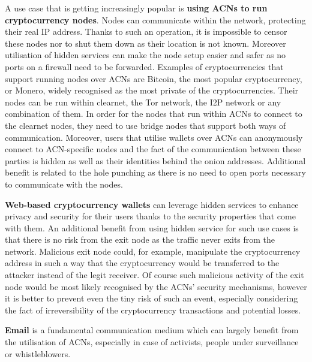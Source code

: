 A use case that is getting increasingly popular is \textbf{using ACNs to run cryptocurrency nodes}. Nodes can communicate within the network, protecting their real IP address. Thanks to such an operation, it is impossible to censor these nodes nor to shut them down as their location is not known. Moreover utilisation of hidden services can make the node setup easier and safer as no ports on a firewall need to be forwarded. Examples of cryptocurrencies that support running nodes over ACNs are Bitcoin, the most popular cryptocurrency, or Monero, widely recognised as the most private of the cryptocurrencies. Their nodes can be run within clearnet, the Tor network, the I2P network or any combination of them. In order for the nodes that run within ACNs to connect to the clearnet nodes, they need to use bridge nodes that support both ways of communication. Moreover, users that utilise wallets over ACNs can anonymously connect to ACN-specific nodes and the fact of the communication between these parties is hidden as well as their identities behind the onion addresses. Additional benefit is related to the hole punching as there is no need to open ports necessary to communicate with the nodes.

\textbf{Web-based cryptocurrency wallets} can leverage hidden services to enhance privacy and security for their users thanks to the security properties that come with them. An additional benefit from using hidden service for such use cases is that there is no risk from the exit node as the traffic never exits from the network. Malicious exit node could, for example, manipulate the cryptocurrency address in such a way that the cryptocurrency would be transferred to the attacker instead of the legit receiver. Of course such malicious activity of the exit node would be most likely recognised by the ACNs’ security mechanisms, however it is better to prevent even the tiny risk of such an event, especially considering the fact of irreversibility of the cryptocurrency transactions and potential losses.

\textbf{Email} is a fundamental communication medium which can largely benefit from the utilisation of ACNs, especially in case of activists, people under surveillance or whistleblowers.

